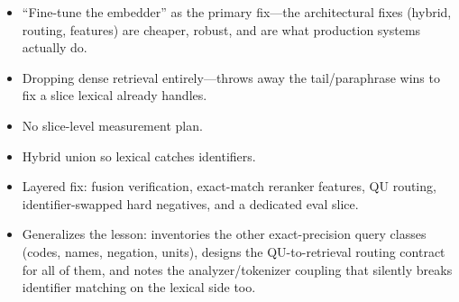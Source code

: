 \begin{interviewq}
\redflags
\begin{itemize}
    \item ``Fine-tune the embedder'' as the primary fix---the architectural fixes (hybrid, routing, features) are cheaper, robust, and are what production systems actually do.
    \item Dropping dense retrieval entirely---throws away the tail/paraphrase wins to fix a slice lexical already handles.
    \item No slice-level measurement plan.
\end{itemize}


\goodgreat
\begin{itemize}
    \item {} Hybrid union so lexical catches identifiers.
    \item {} Layered fix: fusion verification, exact-match reranker features, QU routing, identifier-swapped hard negatives, and a dedicated eval slice.
    \item {} Generalizes the lesson: inventories the other exact-precision query classes (codes, names, negation, units), designs the QU-to-retrieval routing contract for all of them, and notes the analyzer/tokenizer coupling that silently breaks identifier matching on the lexical side too.
\end{itemize}

\end{interviewq}


